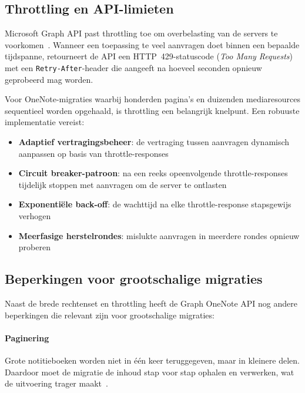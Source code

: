\subsection{Throttling en API-limieten}
\label{subsec:graph-throttling}

Microsoft Graph API past throttling toe om overbelasting van de servers te voorkomen~\autocite{microsoft2025throttling}. Wanneer een toepassing te veel aanvragen doet binnen een bepaalde tijdspanne, retourneert de API een HTTP~429-statuscode (\emph{Too Many Requests}) met een \texttt{Retry-After}-header die aangeeft na hoeveel seconden opnieuw geprobeerd mag worden.

Voor OneNote-migraties waarbij honderden pagina's en duizenden mediaresources sequentieel worden opgehaald, is throttling een belangrijk knelpunt. Een robuuste implementatie vereist:

\begin{itemize}
    \item \textbf{Adaptief vertragingsbeheer}: de vertraging tussen aanvragen dynamisch aanpassen op basis van throttle-responses
    \item \textbf{Circuit breaker-patroon}: na een reeks opeenvolgende throttle-responses tijdelijk stoppen met aanvragen om de server te ontlasten
    \item \textbf{Exponentiële back-off}: de wachttijd na elke throttle-response stapsgewijs verhogen
    \item \textbf{Meerfasige herstelrondes}: mislukte aanvragen in meerdere rondes opnieuw proberen
\end{itemize}

\subsection{Beperkingen voor grootschalige migraties}
\label{subsec:graph-beperkingen}

Naast de brede rechtenset en throttling heeft de Graph OneNote API nog andere beperkingen die relevant zijn voor grootschalige migraties:

\paragraph{Paginering}
Grote notitieboeken worden niet in één keer teruggegeven, maar in kleinere delen. Daardoor moet de migratie de inhoud stap voor stap ophalen en verwerken, wat de uitvoering trager maakt~\autocite{msgraph2025notes}.

